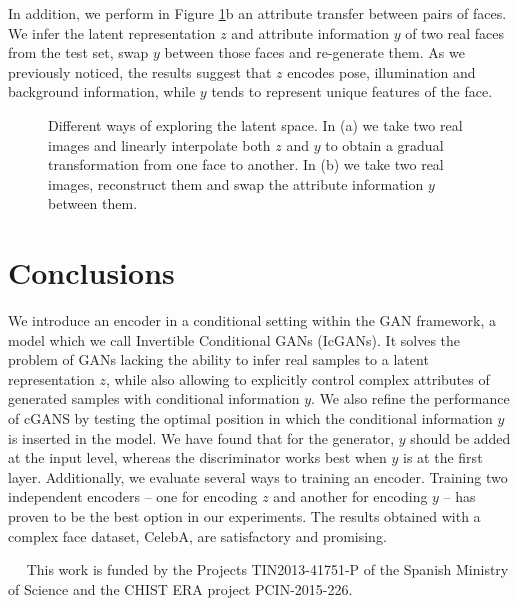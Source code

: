 \documentclass{article}
\newcommand{\minisection}[1]{\vspace{0.04in} \noindent {\bf #1}\ \ }
\begin{document}
In addition, we perform in Figure \ref{fig:icgan_manipulate_Z}b an attribute transfer between pairs of faces. We infer the latent representation $z$ and attribute information $y$ of two real faces from the test set, swap $y$ between those faces and re-generate them. As we previously noticed, the results suggest that $z$ encodes pose, illumination and background information, while $y$ tends to represent unique features of the face.

\begin{figure}[t]
        \centering
        \caption{Different ways of exploring the latent space. In (a) we take two real images and linearly interpolate both $z$ and $y$ to obtain a gradual transformation from one face to another. In (b) we take two real images, reconstruct them and swap the attribute information $y$ between them.} \label{fig:icgan_manipulate_Z}
\end{figure} 
\section{Conclusions} \label{sec:conclusions}


We introduce an encoder in a conditional setting within the GAN framework, a model which we call Invertible Conditional GANs (IcGANs). It solves the problem of GANs lacking the ability to infer real samples to a latent representation $z$, while also allowing to explicitly control complex attributes of generated samples with conditional information $y$. We also refine the performance of cGANS by testing the optimal position in which the conditional information $y$ is inserted in the model. We have found that for the generator, $y$ should be added at the input level, whereas the discriminator works best when $y$ is at the first layer. Additionally, we evaluate several ways to training an encoder. Training two independent encoders -- one for encoding $z$ and another for encoding $y$ -- has proven to be the best option in our experiments. The results obtained with a complex face dataset, CelebA, are satisfactory and promising.

%
 
\minisection{Acknowledgments}
This work is funded by the Projects TIN2013-41751-P of the Spanish Ministry of Science and the CHIST ERA project PCIN-2015-226.

\newpage

{\small
}
\end{document}
